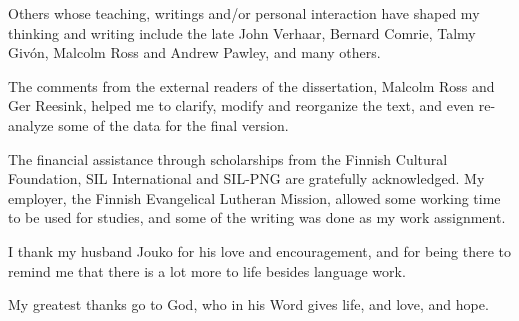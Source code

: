 Others whose teaching, writings and/or personal interaction have shaped my thinking and writing include the late John Verhaar, Bernard Comrie, Talmy Giv\'on, Malcolm Ross and Andrew Pawley, and many others.  

The comments from the external readers of the dissertation, Malcolm Ross and Ger Reesink, helped me to clarify, modify and reorganize the text, and even re-analyze some of the data for the final version.

The financial assistance through scholarships from the Finnish Cultural Foundation, SIL International and SIL-PNG are gratefully acknowledged. My employer, the Finnish Evangelical Lutheran Mission, allowed some working time to be used for studies, and some of the writing was done as my work assignment. 

I thank my husband Jouko for his love and encouragement, and for being there to remind me that there is a lot more to life besides language work.

My greatest thanks go to God, who in his Word gives life, and love, and hope.